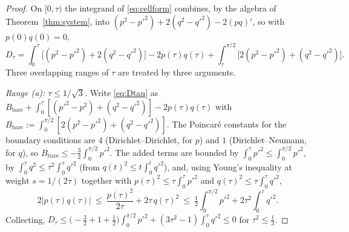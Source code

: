 \documentclass[11pt]{article}
\theoremstyle{definition}
\begin{document}
\begin{proof}
On $[0,\tau)$ the integrand of \eqref{eq:cellform} combines, by the algebra of
Theorem~\ref{thm:system}, into $(p^2-p'^2)+2(q^2-q'^2)-2(pq)'$, so with $p(0)q(0)=0$,
\begin{equation}\label{eq:Dtau}
  D_\tau=\int_0^\tau\bigl[(p^2-p'^2)+2(q^2-q'^2)\bigr]-2p(\tau)q(\tau)
  +\int_\tau^{\pi/2}\bigl[2(p^2-p'^2)+(q^2-q'^2)\bigr].
\end{equation}
Three overlapping ranges of $\tau$ are treated by three arguments.

\emph{Range (a): $\tau\le1/\sqrt3$.} Write \eqref{eq:Dtau} as
$B_{\mathrm{bare}}+\int_0^\tau[(p'^2-p^2)+(q^2-q'^2)]-2p(\tau)q(\tau)$ with
$B_{\mathrm{bare}}:=\int_0^{\pi/2}[2(p^2-p'^2)+(q^2-q'^2)]$. The Poincar\'e constants for
the boundary conditions are $4$ (Dirichlet--Dirichlet, for $p$) and $1$
(Dirichlet--Neumann, for $q$), so $B_{\mathrm{bare}}\le-\tfrac32\int_0^{\pi/2}p'^2$. The
added terms are bounded by $\int_0^\tau p'^2\le\int_0^{\pi/2}p'^2$, by
$\int_0^\tau q^2\le\tau^2\int_0^\tau q'^2$ (from $q(t)^2\le t\int_0^tq'^2$), and, using
Young's inequality at weight $s=1/(2\tau)$ together with $p(\tau)^2\le\tau\int_0^\tau p'^2$
and $q(\tau)^2\le\tau\int_0^\tau q'^2$,
\[
  2|p(\tau)q(\tau)|\ \le\ \frac{p(\tau)^2}{2\tau}+2\tau\,q(\tau)^2
  \ \le\ \tfrac12\int_0^{\pi/2}p'^2+2\tau^2\int_0^\tau q'^2 .
\]
Collecting, $D_\tau\le\bigl(-\tfrac32+1+\tfrac12\bigr)\int_0^{\pi/2}p'^2
+(3\tau^2-1)\int_0^\tau q'^2\le0$ for $\tau^2\le\tfrac13$.


\end{proof}
\end{document}
